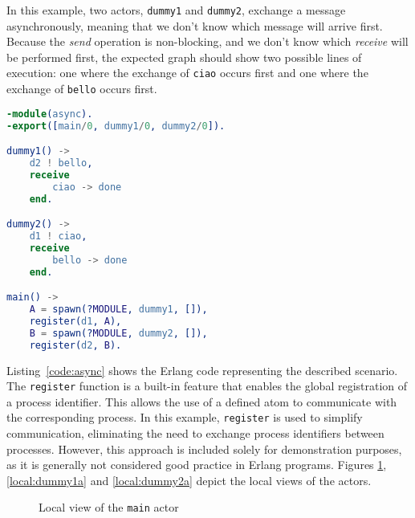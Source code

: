 \begin{exmp}
In this example, two actors, \texttt{dummy1} and \texttt{dummy2}, exchange a 
message asynchronously, meaning that we don't know which message will arrive 
first. Because the \textit{send} operation is non-blocking, and we don't know 
which \textit{receive} will be performed first, the expected graph should show 
two possible lines of execution: one where the exchange of \texttt{ciao} occurs 
first and one where the exchange of \texttt{bello} occurs first.

\bigskip

\begin{lstlisting}[language=Erlang, caption=Two processes exchanging messages 
asynchronously, label=code:async]
-module(async).
-export([main/0, dummy1/0, dummy2/0]).

dummy1() ->
    d2 ! bello,
    receive
        ciao -> done
    end.

dummy2() ->
    d1 ! ciao,
    receive
        bello -> done
    end.

main() ->
    A = spawn(?MODULE, dummy1, []),
    register(d1, A),
    B = spawn(?MODULE, dummy2, []),
    register(d2, B).
\end{lstlisting}

Listing~\ref{code:async} shows the Erlang code representing the  
described scenario. The \texttt{register} function is a built-in  
feature that enables the global registration of a process identifier.  
This allows the use of a defined atom to communicate with the  
corresponding process.  
In this example, \texttt{register} is used to simplify communication,  
eliminating the need to exchange process identifiers between processes.  
However, this approach is included solely for demonstration purposes,  
as it is generally not considered good practice in Erlang programs.
Figures \ref{local:main}, \ref{local:dummy1a} and \ref{local:dummy2a} depict the local
views of the actors.

\begin{figure}[!ht]
    \centering
    \caption{Local view of the \texttt{main} actor}
    \label{local:main}
\end{figure}


\end{exmp}
